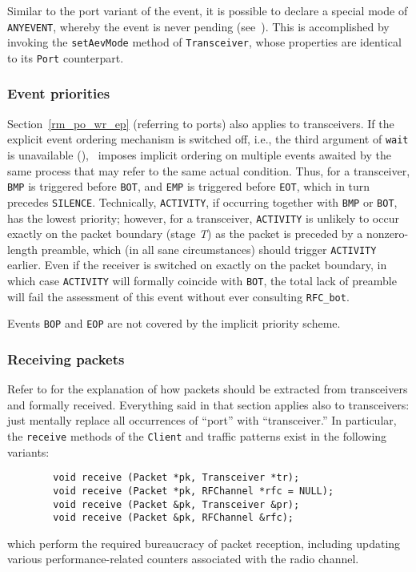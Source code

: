 Similar to the port variant of the event, it is possible to
declare a special mode of {\tt ANYEVENT}, whereby the event is never pending
(see~).
This is accomplished by invoking the {\tt setAevMode} method of
{\tt Transceiver}, whose properties are identical to its {\tt Port}
counterpart.

\subsubsection{Event priorities}
\label{rm_tr_pp_ep}

Section~\ref{rm_po_wr_ep} (referring to ports) also applies to
transceivers.
If the explicit event ordering mechanism is switched off, i.e.,
the third argument of {\tt wait} is unavailable (),
\smurph\ imposes implicit ordering on multiple events awaited by the
same process that may refer to the same actual condition.
Thus, for a transceiver,
{\tt BMP} is triggered before {\tt BOT}, and {\tt EMP} is triggered
before {\tt EOT}, which in turn precedes {\tt SILENCE}.
Technically, {\tt ACTIVITY}, if occurring together with {\tt BMP} or
{\tt BOT}, has the lowest priority; however, for a transceiver, 
{\tt ACTIVITY} is unlikely to occur exactly on the packet boundary
(stage {\em T\/}) as the packet is preceded by a nonzero-length preamble,
which (in all sane circumstances) should trigger {\tt ACTIVITY} earlier.
Even if the receiver is switched on exactly on the packet boundary, in
which case {\tt ACTIVITY} will formally coincide with {\tt BOT},
the total lack of preamble will fail the assessment of this event
without ever consulting {\tt RFC\_bot}.

Events {\tt BOP} and {\tt EOP} are not covered by the implicit
priority scheme.

\subsubsection{Receiving packets}
\label{rm_tr_pp_rp}

Refer to  for the explanation of how packets should be
extracted from transceivers and formally received.
Everything said in that section applies also to transceivers: just mentally
replace all occurrences of ``port'' with ``transceiver.''
In particular, the {\tt receive} methods of the {\tt Client} and
traffic patterns exist in the following variants:
\begin{verbatim}
        void receive (Packet *pk, Transceiver *tr);
        void receive (Packet *pk, RFChannel *rfc = NULL);
        void receive (Packet &pk, Transceiver &pr);
        void receive (Packet &pk, RFChannel &rfc);
\end{verbatim}
\noindent
which perform the required bureaucracy of packet reception, including updating
various performance-related counters associated with the radio channel.

